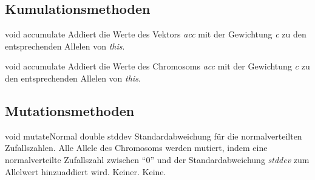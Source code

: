 \documentclass{report}
\begin{document}
\newpage

\subsection{Kumulationsmethoden}

\setNormalInstance
\setCorrectWidthThree{8pt}
\printMethodWithParamsSaved
{void}
{}
{accumulate}
{Addiert die Werte des Vektors {\em acc} mit der Gewichtung {\em c} zu den 
 entsprechenden Allelen von {\em this}.}
{}
\setCorrectWidthThree{4pt}

\vspace{4ex}

\setNormalInstance
\setCorrectWidthThree{8pt}
\printMethodWithParamsSaved
{void}
{}
{accumulate}
{Addiert die Werte des Chromosoms {\em acc} mit der Gewichtung {\em c} zu den 
 entsprechenden Allelen von {\em this}.}
{}
\setCorrectWidthThree{4pt}


\subsection{Mutationsmethoden}

\setNormalInstance
\printMethodWithOneParam
{void}
{mutateNormal}
{double}
{stddev}
{Standardabweichung f\"ur die normalverteilten Zufallszahlen.}
{Alle Allele des Chromosoms werden mutiert, indem eine normalverteilte
 Zufallszahl zwischen ``0'' und der Standardabweichung {\em stddev} zum
 Allelwert hinzuaddiert wird.}
{Keiner.}
{Keine.}
\end{document}
